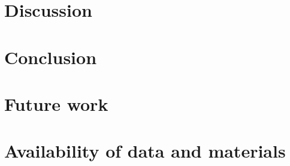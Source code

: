 \section{Discussion}

\section{Conclusion}

\section{Future work}

\section{Availability of data and materials}